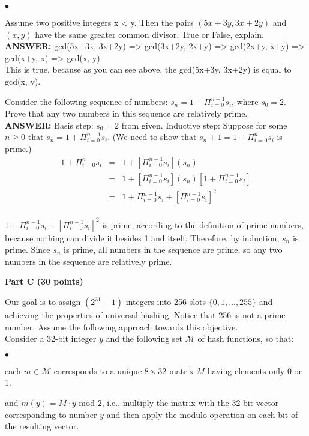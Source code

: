 \documentclass{article}
\newenvironment{myitem}{\begin{list}{$\bullet$}
{\setlength{\itemsep}{-0pt}
\setlength{\topsep}{0pt}
\setlength{\labelwidth}{0pt}
\setlength{\leftmargin}{10pt}
\setlength{\parsep}{-0pt}
\setlength{\itemsep}{0pt}
\setlength{\partopsep}{0pt}}}%
{\end{list}}
\begin{document}
\begin{myitem}
\item Assume two positive integers x < y. Then the pairs
  $(5x+3y,3x+2y)$ and $(x,y)$ have the same greater common
  divisor. True or False, explain.\\

{\bfseries ANSWER: }gcd(5x+3x, 3x+2y) => gcd(3x+2y, 2x+y) => gcd(2x+y, x+y) => gcd(x+y, x) => gcd(x, y)\\
This is true, because as you can see above, the gcd(5x+3y, 3x+2y) is equal to gcd(x, y).\\

\item Consider the following sequence of numbers: $s_n = 1 +
  \Pi_{i=0}^{n-1} s_i$, where $s_0 = 2$. Prove that any two numbers in
  this sequence are relatively prime.\\

{\bfseries ANSWER: }Basis step: $s_0=2$ from given.
Inductive step: Suppose for some $n \geq 0$ that $s_n=1+\Pi_{i=0}^{n-1} s_i$. (We need to show that $s_n+1=1+\Pi_{i=0}^{n}s_i$ is prime.)
\begin{eqnarray*}
	1+\Pi_{i=0}^{n} s_i &=& 1+[\Pi_{i=0}^{n-1} s_i](s_n)\\
	&=& 1+[\Pi_{i=0}^{n-1} s_i](s_n)[1+\Pi_{i=0}^{n-1} s_i]\\
	&=& 1+\Pi_{i=0}^{n-1} s_i+[\Pi_{i=0}^{n-1} s_i]^2\\
\end{eqnarray*}

$1+\Pi_{i=0}^{n-1} s_i+[\Pi_{i=0}^{n-1} s_i]^2$ is prime, according to the definition of prime numbers, because nothing can divide it besides 1 and itself. Therefore, by induction, $s_n$ is prime. Since $s_n$ is prime, all numbers in the sequence are prime, so any two numbers in the sequence are relatively prime.

\end{myitem}

\begin{center}
{\bf Part C (30 points)}
\end{center}

 Our goal is to assign $(2^{31}-1)$ integers
into 256 slots $\{0,1, \dots, 255\}$ and achieving the properties of
universal hashing. Notice that 256 is not a prime number. Assume the
following approach towards this objective.\\

\noindent Consider a 32-bit integer $y$ and the following set $\mathcal{M}$ of
hash functions, so that:
\begin{myitem}
\item each $m \in \mathcal{M}$ corresponds to a unique $8 \times 32$
  matrix $M$ having elements only 0 or 1.
\item and $m(y) = M \cdot y$ mod $2$, i.e., multiply the matrix with
  the 32-bit vector corresponding to number $y$ and then apply the
  modulo operation on each bit of the resulting vector.\\
\end{myitem}
\end{document}
